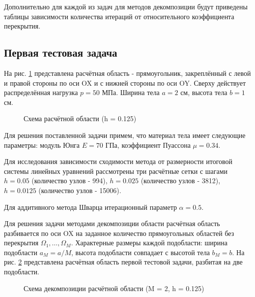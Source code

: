 \documentclass[a4paper, 14pt]{extarticle}
\newcommand{\area}{rectangle}
\newcommand{\task}{3_fixes}
\newcommand{\taskNum}{01}
\begin{document}
Дополнительно для каждой из задач для методов декомпозиции будут приведены таблицы зависимости количества итераций от относительного коэффициента перекрытия.

\newpage

\subsection{Первая тестовая задача}

На рис. \ref{fig:task_\taskNum_scheme} представлена расчётная область - прямоугольник, закреплённый с левой и правой стороны по оси OX и с нижней стороны по оси OY. Сверху действует распределённая нагрузка $p = 50$ МПа. Ширина тела $a = 2$ см, высота тела $b = 1$ см.

\begin{figure}[h]
\caption{Схема расчётной области (h = 0.125)}
\label{fig:task_\taskNum_scheme}
\end{figure}

Для решения поставленной задачи примем, что материал тела имеет следующие параметры: модуль Юнга $E = 70$ ГПа, коэффициент Пуассона $\mu = 0.34$. 

Для исследования зависимости сходимости метода от размерности итоговой системы линейных уравнений рассмотрены три расчётные сетки с шагами $h = 0.05$ (количество узлов - 994), $h = 0.025$ (количество узлов - 3812), $h = 0.0125$ (количество узлов - 15006).

Для аддитивного метода Шварца итерационный параметр $\alpha = 0.5$.

\newpage

Для решения задачи методами декомпозиции области расчётная область разбивается по оси OX на заданное количество прямоугольных областей без перекрытия $\Omega_1, \ldots, \Omega_M$. Характерные размеры каждой подобласти: ширина подобласти $a_M = a / M$, высота подобласти совпадает с высотой тела $b_M = b$. На рис. \ref{fig:task_\taskNum_decomposition} представлена расчётная область первой тестовой задачи, разбитая на две подобласти.

\begin{figure}[h]
\caption{Схема декомпозиции расчётной области (M = 2, h = 0.125)}
\label{fig:task_\taskNum_decomposition}
\end{figure}
\end{document}
